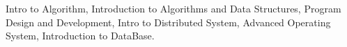 

\begin{cvparagraph}
Intro to Algorithm, Introduction to Algorithms and Data Structures, Program Design and Development, Intro to Distributed System, Advanced
Operating System, Introduction to DataBase.
\end{cvparagraph}

